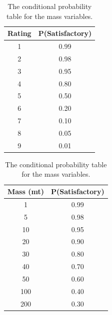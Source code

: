 \documentclass{svproc}
\begin{document}
\begin{table}
	\begin{minipage}{0.5\linewidth}
		\caption{The conditional probability table for the rated variables.}
		\label{table:prob_ratings}
		\centering
            \begin{tabular}{c c}
            \hline
            Rating & P(Satisfactory) \\
            \hline
            1      & 0.99            \\
            2      & 0.98            \\
            3      & 0.95            \\
            4      & 0.80            \\
            5      & 0.50            \\
            6      & 0.20            \\
            7      & 0.10            \\
            8      & 0.05            \\
            9      & 0.01  \\
            \hline
            \end{tabular}
	\end{minipage}\hfill
	\begin{minipage}{0.45\linewidth}
		\caption{The conditional probability table for the mass variables.}
		\label{table:prob_weight}
		\centering
            \begin{tabular}{c c}
            \hline
            Mass (mt) & P(Satisfactory) \\
            \hline
            1           & 0.99            \\
            5           & 0.98            \\
            10          & 0.95            \\
            20          & 0.90            \\
            30          & 0.80            \\
            40          & 0.70            \\
            50          & 0.60            \\
            100         & 0.40            \\
            200         & 0.30  \\
            \hline
            \end{tabular}
	\end{minipage}
\end{table}
\end{document}
